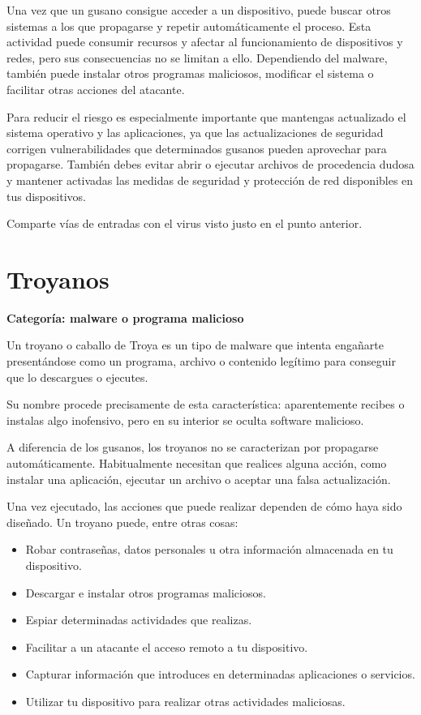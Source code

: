 \documentclass[
  spanish,
  a4paper,
  openany]{book}
\begin{document}
Una vez que un gusano consigue acceder a un dispositivo, puede buscar otros sistemas a los que propagarse y repetir automáticamente el proceso. Esta actividad puede consumir recursos y afectar al funcionamiento de dispositivos y redes, pero sus consecuencias no se limitan a ello. Dependiendo del malware, también puede instalar otros programas maliciosos, modificar el sistema o facilitar otras acciones del atacante.

Para reducir el riesgo es especialmente importante que mantengas actualizado el sistema operativo y las aplicaciones, ya que las actualizaciones de seguridad corrigen vulnerabilidades que determinados gusanos pueden aprovechar para propagarse. También debes evitar abrir o ejecutar archivos de procedencia dudosa y mantener activadas las medidas de seguridad y protección de red disponibles en tus dispositivos.

Comparte vías de entradas con el virus visto justo en el punto anterior.

\section{Troyanos}\label{troyanos}

\textbf{Categoría: malware o programa malicioso}

Un troyano o caballo de Troya es un tipo de malware que intenta engañarte presentándose como un programa, archivo o contenido legítimo para conseguir que lo descargues o ejecutes.

Su nombre procede precisamente de esta característica: aparentemente recibes o instalas algo inofensivo, pero en su interior se oculta software malicioso.

A diferencia de los gusanos, los troyanos no se caracterizan por propagarse automáticamente. Habitualmente necesitan que realices alguna acción, como instalar una aplicación, ejecutar un archivo o aceptar una falsa actualización.

Una vez ejecutado, las acciones que puede realizar dependen de cómo haya sido diseñado. Un troyano puede, entre otras cosas:

\begin{itemize}
\item
  Robar contraseñas, datos personales u otra información almacenada en tu dispositivo.
\item
  Descargar e instalar otros programas maliciosos.
\item
  Espiar determinadas actividades que realizas.
\item
  Facilitar a un atacante el acceso remoto a tu dispositivo.
\item
  Capturar información que introduces en determinadas aplicaciones o servicios.
\item
  Utilizar tu dispositivo para realizar otras actividades maliciosas.
\end{itemize}
\end{document}
